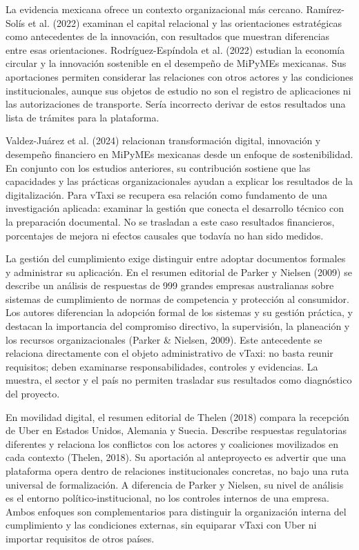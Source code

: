 {La evidencia mexicana ofrece un contexto organizacional más cercano. Ramírez-Solís et al. (2022) examinan el capital relacional y las orientaciones estratégicas como antecedentes de la innovación, con resultados que muestran diferencias entre esas orientaciones. Rodríguez-Espíndola et al. (2022) estudian la economía circular y la innovación sostenible en el desempeño de MiPyMEs mexicanas. Sus aportaciones permiten considerar las relaciones con otros actores y las condiciones institucionales, aunque sus objetos de estudio no son el registro de aplicaciones ni las autorizaciones de transporte. Sería incorrecto derivar de estos resultados una lista de trámites para la plataforma.


Valdez-Juárez et al. (2024) relacionan transformación digital, innovación y desempeño financiero en MiPyMEs mexicanas desde un enfoque de sostenibilidad. En conjunto con los estudios anteriores, su contribución sostiene que las capacidades y las prácticas organizacionales ayudan a explicar los resultados de la digitalización. Para vTaxi se recupera esa relación como fundamento de una investigación aplicada: examinar la gestión que conecta el desarrollo técnico con la preparación documental. No se trasladan a este caso resultados financieros, porcentajes de mejora ni efectos causales que todavía no han sido medidos.


La gestión del cumplimiento exige distinguir entre adoptar documentos formales y administrar su aplicación. En el resumen editorial de Parker y Nielsen (2009) se describe un análisis de respuestas de 999 grandes empresas australianas sobre sistemas de cumplimiento de normas de competencia y protección al consumidor. Los autores diferencian la adopción formal de los sistemas y su gestión práctica, y destacan la importancia del compromiso directivo, la supervisión, la planeación y los recursos organizacionales (Parker \& Nielsen, 2009). Este antecedente se relaciona directamente con el objeto administrativo de vTaxi: no basta reunir requisitos; deben examinarse responsabilidades, controles y evidencias. La muestra, el sector y el país no permiten trasladar sus resultados como diagnóstico del proyecto.


En movilidad digital, el resumen editorial de Thelen (2018) compara la recepción de Uber en Estados Unidos, Alemania y Suecia. Describe respuestas regulatorias diferentes y relaciona los conflictos con los actores y coaliciones movilizados en cada contexto (Thelen, 2018). Su aportación al anteproyecto es advertir que una plataforma opera dentro de relaciones institucionales concretas, no bajo una ruta universal de formalización. A diferencia de Parker y Nielsen, su nivel de análisis es el entorno político-institucional, no los controles internos de una empresa. Ambos enfoques son complementarios para distinguir la organización interna del cumplimiento y las condiciones externas, sin equiparar vTaxi con Uber ni importar requisitos de otros países.


}
